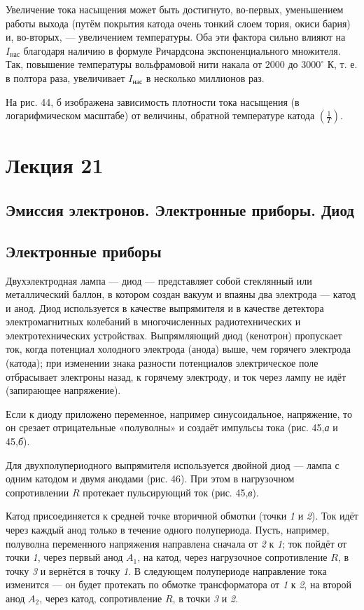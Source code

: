 \documentclass[a4paper,10pt]{book}
\begin{document}
Увеличение тока насыщения может быть достигнуто, во-первых, уменьшением работы выхода (путём покрытия катода очень тонкий слоем тория, окиси бария) и, во-вторых, — увеличением температуры. Оба эти фактора сильно влияют на $I_\text{нас}$ благодаря наличию в формуле Ричардсона экспоненциального множителя. Так, повышение температуры вольфрамовой нити накала от $2000$ до $3000^{\circ}\text{ К}$, т. е. в полтора раза, увеличивает $I_\text{нас}$ в несколько миллионов раз.

На рис. 44, б изображена зависимость плотности тока насыщения (в логарифмическом масштабе) от величины, обратной температуре катода $(\frac{1}{T})$.


\chapter{Лекция 21}
\section*{Эмиссия электронов. Электронные приборы. Диод}
\section{Электронные приборы}
Двухэлектродная лампа — диод — представляет собой стеклянный или металлический баллон, в котором создан вакуум и впаяны два электрода — катод и анод. Диод используется в качестве выпрямителя и в качестве детектора электромагнитных колебаний в многочисленных радиотехнических и электротехнических устройствах. Выпрямляющий диод (кенотрон) пропускает ток, когда потенциал холодного электрода (анода) выше, чем горячего электрода (катода); при изменении знака разности потенциалов электрическое поле отбрасывает электроны назад, к горячему электроду, и ток через лампу не идёт (запирающее напряжение).

Если к диоду приложено переменное, например синусоидальное, напряжение, то он срезает отрицательные «полуволны» и создаёт импульсы тока (рис. 45,\textit{а} и 45,\textit{б}).

Для двухполупериодного выпрямителя используется двойной диод — лампа с одним катодом и двумя анодами (рис. 46). При этом в нагрузочном сопротивлении $R$ протекает пульсирующий ток (рис. 45,\textit{в}). 

Катод присоединяется к средней точке вторичной обмотки (точки \textit{1} и \textit{2}). Ток идёт через каждый анод только в течение одного полупериода. Пусть, например, полуволна переменного напряжения направлена сначала от \textit{2} к \textit{1}; ток пойдёт от точки \textit{1}, через первый анод $A_1$, на катод, через нагрузочное сопротивление $R$, в точку \textit{3} и вернётся в точку \textit{1}. В следующем полупериоде направление тока изменится — он будет протекать по обмотке трансформатора от \textit{1} к \textit{2}, на второй анод $A_2$, через катод, сопротивление $R$, в точки \textit{3} и \textit{2}.
\end{document}
